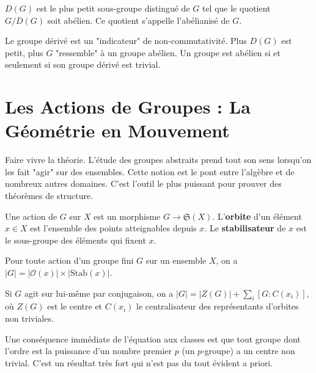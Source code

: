 \begin{proposition}
    $D(G)$ est le plus petit sous-groupe distingué de $G$ tel que le quotient $G/D(G)$ soit abélien. Ce quotient s'appelle l'abélianisé de $G$.
\end{proposition}

\begin{remark}
    Le groupe dérivé est un "indicateur" de non-commutativité. Plus $D(G)$ est petit, plus $G$ "ressemble" à un groupe abélien. Un groupe est abélien si et seulement si son groupe dérivé est trivial.
\end{remark}

\section{Les Actions de Groupes : La Géométrie en Mouvement}

\begin{objectif}
    Faire vivre la théorie. L'étude des groupes abstraits prend tout son sens lorsqu'on les fait "agir" sur des ensembles. Cette notion est le pont entre l'algèbre et de nombreux autres domaines. C'est l'outil le plus puissant pour prouver des théorèmes de structure.
\end{objectif}

\begin{definition}
    Une action de $G$ sur $X$ est un morphisme $G \to \mathfrak{S}(X)$.
    L'\textbf{orbite} d'un élément $x \in X$ est l'ensemble des points atteignables depuis $x$.
    Le \textbf{stabilisateur} de $x$ est le sous-groupe des éléments qui fixent $x$.
\end{definition}

\begin{theorem}
    Pour toute action d'un groupe fini $G$ sur un ensemble $X$, on a $|G| = |\mathcal{O}(x)| \times |\mathrm{Stab}(x)|$.
\end{theorem}

\begin{theorem}
    Si $G$ agit sur lui-même par conjugaison, on a $|G| = |Z(G)| + \sum_{i} [G : C(x_i)]$, où $Z(G)$ est le centre et $C(x_i)$ le centralisateur des représentants d'orbites non triviales.
\end{theorem}

\begin{application}
    Une conséquence immédiate de l'équation aux classes est que tout groupe dont l'ordre est la puissance d'un nombre premier $p$ (un $p$-groupe) a un centre non trivial. C'est un résultat très fort qui n'est pas du tout évident a priori.
\end{application}


